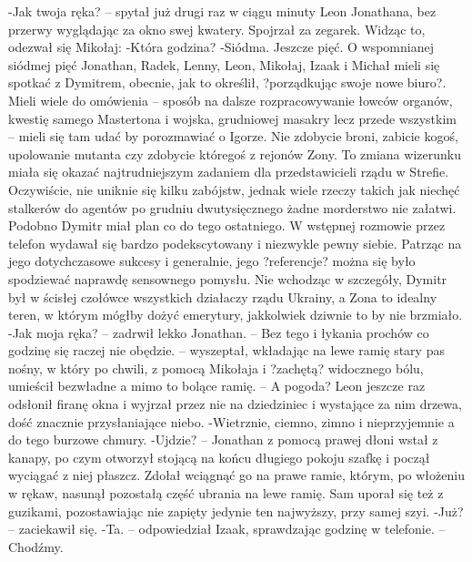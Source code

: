 \documentclass[../MAIN.tex]{subfiles}
\begin{document}
-Jak twoja ręka? -- spytał już drugi raz w ciągu minuty Leon Jonathana, bez przerwy wyglądając za okno swej kwatery. Spojrzał za zegarek. Widząc to, odezwał się Mikołaj:
-Która godzina?
-Siódma. Jeszcze pięć.
O wspomnianej siódmej pięć Jonathan, Radek, Lenny, Leon, Mikołaj, Izaak i Michał mieli się spotkać z Dymitrem, obecnie, jak to określił, ?porządkując swoje nowe biuro?. Mieli wiele do omówienia -- sposób na dalsze rozpracowywanie łowców organów, kwestię samego Mastertona i wojska, grudniowej masakry lecz przede wszystkim -- mieli się tam udać by porozmawiać o Igorze.
Nie zdobycie broni, zabicie kogoś, upolowanie mutanta czy zdobycie któregoś z rejonów Zony.
To zmiana wizerunku miała się okazać najtrudniejszym zadaniem dla przedstawicieli rządu w Strefie. Oczywiście, nie uniknie się kilku zabójstw, jednak wiele rzeczy takich jak niechęć stalkerów do agentów po grudniu dwutysięcznego żadne morderstwo nie załatwi.
Podobno Dymitr miał plan co do tego ostatniego. W wstępnej rozmowie przez telefon wydawał się bardzo podekscytowany i niezwykle pewny siebie. Patrząc na jego dotychczasowe sukcesy i generalnie, jego ?referencje? można się było spodziewać naprawdę sensownego pomysłu. Nie wchodząc w szczegóły, Dymitr był w ścisłej czołówce wszystkich działaczy rządu Ukrainy, a Zona to idealny teren, w którym mógłby dożyć emerytury, jakkolwiek dziwnie to by nie brzmiało.
-Jak moja ręka? -- zadrwił lekko Jonathan. -- Bez tego i łykania prochów co godzinę się raczej nie obędzie. -- wyszeptał, wkładając na lewe ramię stary pas nośny, w który po chwili, z pomocą Mikołaja i ?zachętą? widocznego bólu, umieścił bezwładne a mimo to bolące ramię. -- A pogoda?
Leon jeszcze raz odsłonił firanę okna i wyjrzał przez nie na dziedziniec i wystające za nim drzewa, dość znacznie przysłaniające niebo.
-Wietrznie, ciemno, zimno i nieprzyjemnie a do tego burzowe chmury.
-Ujdzie? -- Jonathan z pomocą prawej dłoni wstał z kanapy, po czym otworzył stojącą na końcu długiego pokoju szafkę i począł wyciągać z niej płaszcz. Zdołał wciągnąć go na prawe ramie, którym, po włożeniu w rękaw, nasunął pozostałą część ubrania na lewe ramię. Sam uporał się też z guzikami, pozostawiając nie zapięty jedynie ten najwyższy, przy samej szyi.
-Już? -- zaciekawił się.
-Ta. -- odpowiedział Izaak, sprawdzając godzinę w telefonie. -- Chodźmy.
\end{document}
